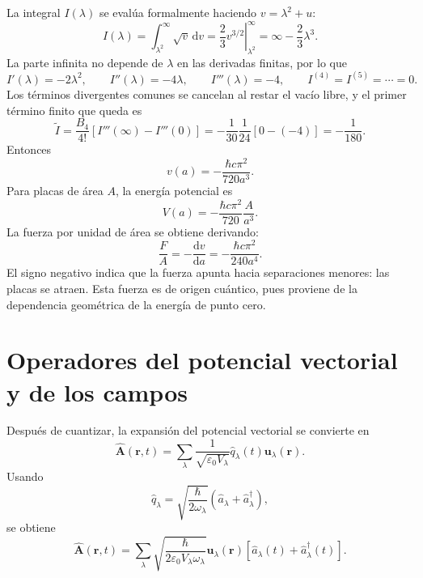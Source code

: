 \documentclass[11pt]{article}
\newcommand{\dd}{\mathrm{d}}
\newcommand{\vb}[1]{\mathbf{#1}}
\begin{document}
La integral $I(\lambda)$ se eval\'ua formalmente haciendo
$v=\lambda^2+u$:
\begin{equation}
  I(\lambda)
  =
  \int_{\lambda^2}^{\infty}\sqrt v\,\dd v
  =
  \left.
  \frac{2}{3}v^{3/2}
  \right|_{\lambda^2}^{\infty}
  =
  \infty-\frac{2}{3}\lambda^3.
\end{equation}
La parte infinita no depende de $\lambda$ en las derivadas finitas, por lo que
\begin{equation}
  I'(\lambda)=-2\lambda^2,
  \qquad
  I''(\lambda)=-4\lambda,
  \qquad
  I'''(\lambda)=-4,
  \qquad
  I^{(4)}=I^{(5)}=\cdots=0.
\end{equation}
Los t\'erminos divergentes comunes se cancelan al restar el vac\'io libre, y
el primer t\'ermino finito que queda es
\begin{equation}
  \tilde I
  =
  \frac{B_4}{4!}
  [I'''(\infty)-I'''(0)]
  =
  -\frac{1}{30}\frac{1}{24}[0-(-4)]
  =
  -\frac{1}{180}.
\end{equation}
Entonces
\begin{equation}
  \boxed{
  v(a)
  =
  -\frac{\hbar c\pi^2}{720a^3}.
  }
\end{equation}
Para placas de \'area $A$, la energ\'ia potencial es
\begin{equation}
  \boxed{
  V(a)
  =
  -\frac{\hbar c\pi^2}{720}\frac{A}{a^3}.
  }
\end{equation}
La fuerza por unidad de \'area se obtiene derivando:
\begin{equation}
  \boxed{
  \frac{F}{A}
  =
  -\frac{\dd v}{\dd a}
  =
  -\frac{\hbar c\pi^2}{240a^4}.
  }
\end{equation}
El signo negativo indica que la fuerza apunta hacia separaciones menores:
las placas se atraen. Esta fuerza es de origen cu\'antico, pues proviene de la
dependencia geom\'etrica de la energ\'ia de punto cero.

\section{Operadores del potencial vectorial y de los campos}

Despu\'es de cuantizar, la expansi\'on del potencial vectorial se convierte en
\begin{equation}
  \hat{\vb A}(\vb r,t)
  =
  \sum_\lambda
  \frac{1}{\sqrt{\varepsilon_0V_\lambda}}
  \hat q_\lambda(t)\vb u_\lambda(\vb r).
\end{equation}
Usando
\begin{equation}
  \hat q_\lambda
  =
  \sqrt{\frac{\hbar}{2\omega_\lambda}}
  (\hat a_\lambda+\hat a_\lambda^\dagger),
\end{equation}
se obtiene
\begin{equation}
  \hat{\vb A}(\vb r,t)
  =
  \sum_\lambda
  \sqrt{
  \frac{\hbar}{2\varepsilon_0V_\lambda\omega_\lambda}
  }
  \vb u_\lambda(\vb r)
  [\hat a_\lambda(t)+\hat a_\lambda^\dagger(t)].
\end{equation}
\end{document}
